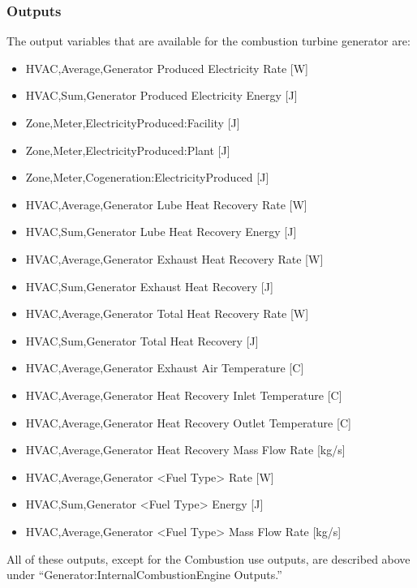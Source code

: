 \subsubsection{Outputs}\label{outputs-6-002}

The output variables that are available for the combustion turbine generator are:

\begin{itemize}
\item
  HVAC,Average,Generator Produced Electricity Rate {[}W{]}
\item
  HVAC,Sum,Generator Produced Electricity Energy {[}J{]}
\item
  Zone,Meter,ElectricityProduced:Facility {[}J{]}
\item
  Zone,Meter,ElectricityProduced:Plant {[}J{]}
\item
  Zone,Meter,Cogeneration:ElectricityProduced {[}J{]}
\item
  HVAC,Average,Generator Lube Heat Recovery Rate {[}W{]}
\item
  HVAC,Sum,Generator Lube Heat Recovery Energy {[}J{]}
\item
  HVAC,Average,Generator Exhaust Heat Recovery Rate {[}W{]}
\item
  HVAC,Sum,Generator Exhaust Heat Recovery {[}J{]}
\item
  HVAC,Average,Generator Total Heat Recovery Rate {[}W{]}
\item
  HVAC,Sum,Generator Total Heat Recovery {[}J{]}
\item
  HVAC,Average,Generator Exhaust Air Temperature {[}C{]}
\item
  HVAC,Average,Generator Heat Recovery Inlet Temperature {[}C{]}
\item
  HVAC,Average,Generator Heat Recovery Outlet Temperature {[}C{]}
\item
  HVAC,Average,Generator Heat Recovery Mass Flow Rate {[}kg/s{]}
\item
  HVAC,Average,Generator \textless{}Fuel Type\textgreater{} Rate {[}W{]}
\item
  HVAC,Sum,Generator \textless{}Fuel Type\textgreater{} Energy {[}J{]}
\item
  HVAC,Average,Generator \textless{}Fuel Type\textgreater{} Mass Flow Rate {[}kg/s{]}
\end{itemize}

All of these outputs, except for the Combustion use outputs, are described above under ``Generator:InternalCombustionEngine Outputs.''

